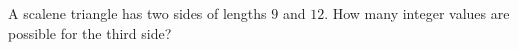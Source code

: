 A scalene triangle has two sides of lengths $9$ and $12$. How many integer values are possible for the third side?
